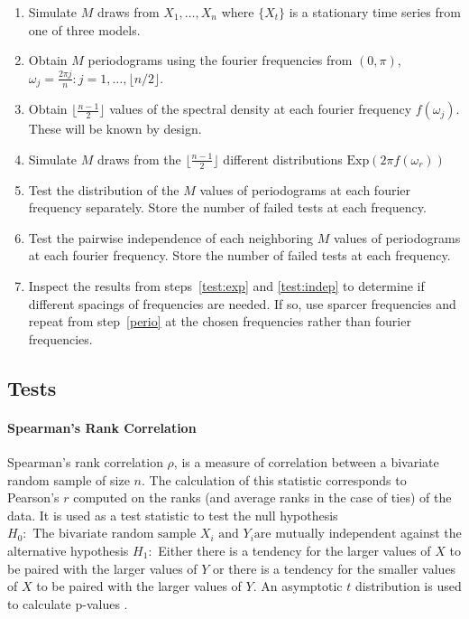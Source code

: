 \documentclass{article}\usepackage{graphicx, color}
\theoremstyle{plain}
\begin{document}
\begin{enumerate}
\item Simulate $M$ draws from $X_1,\dots, X_n$ where $\{X_t\}$ is a stationary time series from one of three models.
\item \label{perio}Obtain $M$ periodograms using the fourier frequencies from $(0, \pi)$, $\omega_j = \frac{2\pi j}{n}: j = 1, \dots, \lfloor n/2 \rfloor$.
\item Obtain $\lfloor\frac{n-1}{2}\rfloor$ values of the spectral density at each fourier frequency $f(\omega_j)$. These will be known by design.
\item Simulate $M$ draws from the $\lfloor\frac{n-1}{2}\rfloor$ different distributions $\text{Exp}(2\pi f(\omega_r))$
\item \label{test:exp}Test the distribution of the $M$ values of periodograms at each fourier frequency separately. Store the number of failed tests at each frequency.
\item \label{test:indep}Test the pairwise independence of each neighboring $M$ values of periodograms at each fourier frequency. Store the number of failed tests at each frequency.
\item Inspect the results from steps~\ref{test:exp} and \ref{test:indep} to determine if different spacings of frequencies are needed. If so, use sparcer frequencies and repeat from step~\ref{perio} at the chosen frequencies rather than fourier frequencies.
\end{enumerate}


\subsection{Tests}



\paragraph{Spearman's Rank Correlation}
Spearman's rank correlation $\rho$, is a measure of correlation between a bivariate random sample of size $n$. The calculation of this statistic corresponds to Pearson's $r$ computed on the ranks (and average ranks in the case of ties) of the data. It is used as a test statistic to test the null hypothesis $H_0: \text{ The bivariate random sample } X_i \text{ and } Y_i \text{are mutually independent}$ against the alternative hypothesis $H_1:$ Either there is a tendency for the larger values of $X$ to be paired with the larger values of $Y$ or there is a tendency for the smaller values of $X$ to be paired with the larger values of $Y$. An asymptotic $t$ distribution is used to calculate p-values \cite{conover1998practical}.
\end{document}
